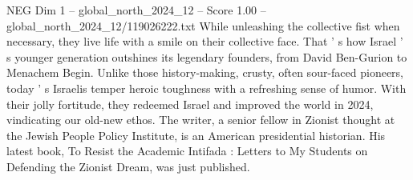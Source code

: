 \begin{textsample}{NEG Dim 1 – global\_north\_2024\_12 – Score 1.00 – global\_north\_2024\_12/119026222.txt}
While unleashing the collective fist when necessary, they live life with a smile on their collective face.
That ' s how Israel ' s younger generation outshines its legendary founders, from David Ben-Gurion to Menachem Begin.
Unlike those history-making, crusty, often sour-faced pioneers, today ' s Israelis temper heroic toughness with a refreshing sense of humor.
With their jolly fortitude, they redeemed Israel and improved the world in 2024, vindicating our old-new ethos.
The writer, a senior fellow in Zionist thought at the Jewish People Policy Institute, is an American presidential historian.
His latest book, To Resist the Academic Intifada : Letters to My Students on Defending the Zionist Dream, was just published.

\end{textsample}
